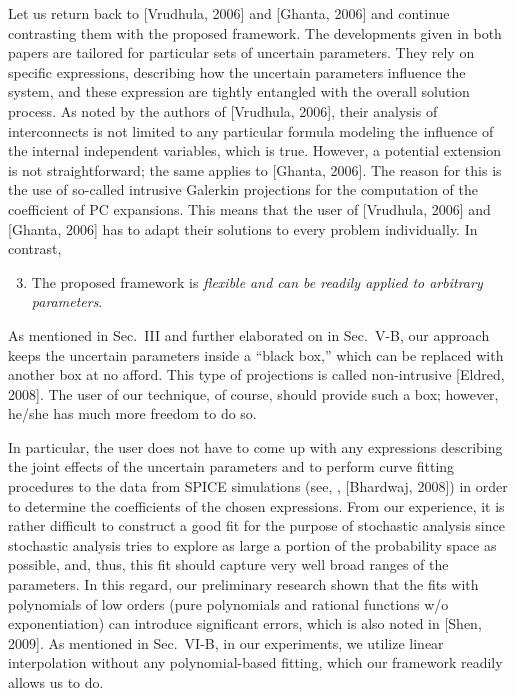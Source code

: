 \begin{authors}
Let us return back to [Vrudhula, 2006] and [Ghanta, 2006] and continue contrasting them with the proposed framework.
The developments given in both papers are tailored for particular sets of uncertain parameters.
They rely on specific expressions, describing how the uncertain parameters influence the system, and these expression are tightly entangled with the overall solution process.
As noted by the authors of [Vrudhula, 2006], their analysis of interconnects is not limited to any particular formula modeling the influence of the internal independent variables, which is true.
However, a potential extension is not straightforward; the same applies to [Ghanta, 2006].
The reason for this is the use of so-called intrusive Galerkin projections for the computation of the coefficient of PC expansions.
This means that the user of [Vrudhula, 2006] and [Ghanta, 2006] has to adapt their solutions to every problem individually.
In contrast,
\begin{enumerate}
  \setcounter{enumi}{2}
  \item The proposed framework is \emph{flexible and can be readily applied to arbitrary parameters}.
\end{enumerate}
As mentioned in Sec.~III and further elaborated on in Sec.~V-B, our approach keeps the uncertain parameters inside a ``black box,'' which can be replaced with another box at no afford.
This type of projections is called non-intrusive [Eldred, 2008].
The user of our technique, of course, should provide such a box; however, he/she has much more freedom to do so.

In particular, the user does not have to come up with any expressions describing the joint effects of the uncertain parameters and to perform curve fitting procedures to the data from SPICE simulations (see, \eg, [Bhardwaj, 2008]) in order to determine the coefficients of the chosen expressions.
From our experience, it is rather difficult to construct a good fit for the purpose of stochastic analysis since stochastic analysis tries to explore as large a portion of the probability space as possible, and, thus, this fit should capture very well broad ranges of the parameters.
In this regard, our preliminary research shown that the fits with polynomials of low orders (pure polynomials and rational functions w/o exponentiation) can introduce significant errors, which is also noted in [Shen, 2009].
As mentioned in Sec.~VI-B, in our experiments, we utilize linear interpolation without any polynomial-based fitting, which our framework readily allows us to do.


\end{authors}
